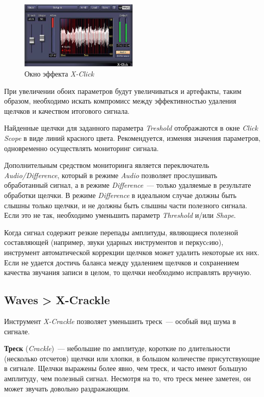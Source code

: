\documentclass[oneside, final, 14pt]{extreport}
\begin{document}
\begin{figure}[h]
\centering
\includegraphics[width=0.5\textwidth]{pic-click-04}
\caption{Окно эффекта \textit{X-Click}}
\label{pic-click-04}
\end{figure}

При увеличении обоих параметров будут увеличиваться и артефакты, таким образом, необходимо искать компромисс между эффективностью удаления щелчков и качеством итогового сигнала.

Найденные щелчки для заданного параметра \textit{Treshold} отображаются в окне \textit{Click Scope} в виде линий красного цвета. Рекомендуется, изменяя значения параметров, одновременно осуществлять мониторинг сигнала.

Дополнительным средством мониторинга является переключатель \textit{Audio/Difference}, который в режиме \textit{Audio} позволяет прослушивать обработанный сигнал, а в режиме \textit{Difference}~--- только удаляемые в результате обработки щелчки. В режиме \textit{Difference} в идеальном случае должны быть слышны только щелчки, и не должны быть слышны части полезного сигнала. Если это не так, необходимо уменьшить параметр \textit{Threshold} и/или \textit{Shape}.

Когда сигнал содержит резкие перепады амплитуды, являющиеся полезной составляющей (например, звуки ударных инструментов и перкусcию), инструмент автоматической коррекции щелчков может удалить некоторые их них. Если не удается достичь баланса между удалением щелчков и сохранением качества звучания записи в целом, то щелчки необходимо исправлять вручную.

\subsection{Waves > X-Crackle}
Инструмент \emph{X-Crackle} позволяет уменьшить треск~--- особый вид шума в сигнале.

\textbf{Треск} (\emph{Crackle})~--- небольшие по амплитуде, короткие по длительности (несколько отсчетов) щелчки или хлопки, в большом количестве присутствующие в сигнале. Щелчки выражены более явно, чем треск, и часто имеют большую амплитуду, чем полезный сигнал. Несмотря на то, что треск менее заметен, он может звучать довольно раздражающим.
\end{document}
